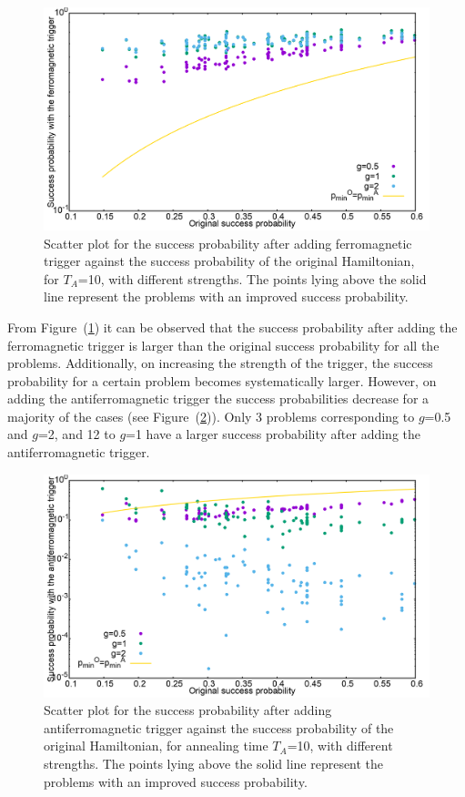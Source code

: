 \documentclass[../main.tex]{subfiles}
\begin{document}
\begin{appendices}
\begin{figure}[H]
\centering 
\includegraphics[scale=0.24]{Succ_OF_8.png}
\caption{Scatter plot for the success probability after adding ferromagnetic trigger against the success probability of the original Hamiltonian, for $T_A$=10, with different strengths. The points lying above the solid line represent the problems with an improved success probability.}
\label{fig:ap3}
\end{figure}
From Figure~(\ref{fig:ap3}) it can be observed that the success probability after adding the ferromagnetic trigger is larger than the original success probability for all the problems. Additionally, on increasing the strength of the trigger, the success probability for a certain problem becomes systematically larger. However, on adding the antiferromagnetic trigger the success probabilities decrease for a majority of the cases (see Figure~(\ref{fig:ap4})). Only 3 problems corresponding to $g$=0.5 and $g$=2, and 12 to $g$=1 have a larger success probability after adding the antiferromagnetic trigger. 


\begin{figure}[H]
\centering 
\includegraphics[scale=0.24]{Succ_OA_8.png}
\caption{Scatter plot for the success probability after adding antiferromagnetic trigger against the success probability of the original Hamiltonian, for annealing time $T_A$=10, with different strengths. The points lying above the solid line represent the problems with an improved success probability.}
\label{fig:ap4}
\end{figure}


\end{appendices}
\end{document}
